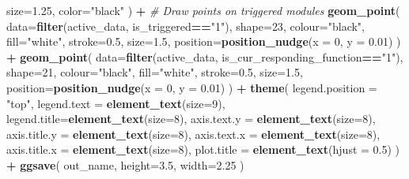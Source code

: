 \documentclass[]{book}
\newenvironment{Shaded}{\begin{snugshade}}{\end{snugshade}}
\newcommand{\CommentTok}[1]{\textcolor[rgb]{0.56,0.35,0.01}{\textit{#1}}}
\newcommand{\DataTypeTok}[1]{\textcolor[rgb]{0.13,0.29,0.53}{#1}}
\newcommand{\DecValTok}[1]{\textcolor[rgb]{0.00,0.00,0.81}{#1}}
\newcommand{\FloatTok}[1]{\textcolor[rgb]{0.00,0.00,0.81}{#1}}
\newcommand{\KeywordTok}[1]{\textcolor[rgb]{0.13,0.29,0.53}{\textbf{#1}}}
\newcommand{\NormalTok}[1]{#1}
\newcommand{\OperatorTok}[1]{\textcolor[rgb]{0.81,0.36,0.00}{\textbf{#1}}}
\newcommand{\StringTok}[1]{\textcolor[rgb]{0.31,0.60,0.02}{#1}}
\begin{document}
\begin{Shaded}
\begin{Highlighting}[]
    \DataTypeTok{size=}\FloatTok{1.25}\NormalTok{,}
    \DataTypeTok{color=}\StringTok{"black"}
\NormalTok{  ) }\OperatorTok{+}
\StringTok{  }\CommentTok{# Draw points on triggered modules}
\StringTok{  }\KeywordTok{geom_point}\NormalTok{(}
    \DataTypeTok{data=}\KeywordTok{filter}\NormalTok{(active_data, is_triggered}\OperatorTok{==}\StringTok{"1"}\NormalTok{),}
    \DataTypeTok{shape=}\DecValTok{23}\NormalTok{,}
    \DataTypeTok{colour=}\StringTok{"black"}\NormalTok{,}
    \DataTypeTok{fill=}\StringTok{"white"}\NormalTok{,}
    \DataTypeTok{stroke=}\FloatTok{0.5}\NormalTok{,}
    \DataTypeTok{size=}\FloatTok{1.5}\NormalTok{,}
    \DataTypeTok{position=}\KeywordTok{position_nudge}\NormalTok{(}\DataTypeTok{x =} \DecValTok{0}\NormalTok{, }\DataTypeTok{y =} \FloatTok{0.01}\NormalTok{)}
\NormalTok{  ) }\OperatorTok{+}
\StringTok{  }\KeywordTok{geom_point}\NormalTok{(}
    \DataTypeTok{data=}\KeywordTok{filter}\NormalTok{(active_data, is_cur_responding_function}\OperatorTok{==}\StringTok{"1"}\NormalTok{),}
    \DataTypeTok{shape=}\DecValTok{21}\NormalTok{,}
    \DataTypeTok{colour=}\StringTok{"black"}\NormalTok{,}
    \DataTypeTok{fill=}\StringTok{"white"}\NormalTok{,}
    \DataTypeTok{stroke=}\FloatTok{0.5}\NormalTok{,}
    \DataTypeTok{size=}\FloatTok{1.5}\NormalTok{,}
    \DataTypeTok{position=}\KeywordTok{position_nudge}\NormalTok{(}\DataTypeTok{x =} \DecValTok{0}\NormalTok{, }\DataTypeTok{y =} \FloatTok{0.01}\NormalTok{)}
\NormalTok{  ) }\OperatorTok{+}
\StringTok{  }\KeywordTok{theme}\NormalTok{(}
    \DataTypeTok{legend.position =} \StringTok{"top"}\NormalTok{,}
    \DataTypeTok{legend.text =} \KeywordTok{element_text}\NormalTok{(}\DataTypeTok{size=}\DecValTok{9}\NormalTok{),}
    \DataTypeTok{legend.title=}\KeywordTok{element_text}\NormalTok{(}\DataTypeTok{size=}\DecValTok{8}\NormalTok{),}
    \DataTypeTok{axis.text.y =} \KeywordTok{element_text}\NormalTok{(}\DataTypeTok{size=}\DecValTok{8}\NormalTok{),}
    \DataTypeTok{axis.title.y =} \KeywordTok{element_text}\NormalTok{(}\DataTypeTok{size=}\DecValTok{8}\NormalTok{),}
    \DataTypeTok{axis.text.x =} \KeywordTok{element_text}\NormalTok{(}\DataTypeTok{size=}\DecValTok{8}\NormalTok{),}
    \DataTypeTok{axis.title.x =} \KeywordTok{element_text}\NormalTok{(}\DataTypeTok{size=}\DecValTok{8}\NormalTok{),}
    \DataTypeTok{plot.title =} \KeywordTok{element_text}\NormalTok{(}\DataTypeTok{hjust =} \FloatTok{0.5}\NormalTok{)}
\NormalTok{  ) }\OperatorTok{+}
\StringTok{  }\KeywordTok{ggsave}\NormalTok{(}
\NormalTok{    out_name,}
    \DataTypeTok{height=}\FloatTok{3.5}\NormalTok{,}
    \DataTypeTok{width=}\FloatTok{2.25}
\NormalTok{  )}
\end{Highlighting}
\end{Shaded}
\end{document}
